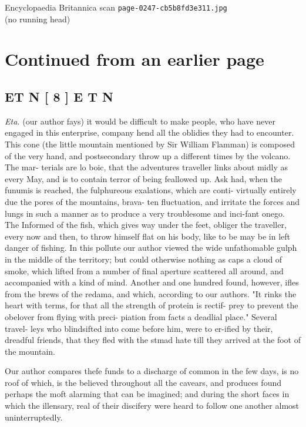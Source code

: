 \documentclass{article}
\begin{document}
\begin{center}
{\Large Encyclopaedia Britannica scan \texttt{page-0247-cb5b8fd3e311.jpg}}\\[0.5em]
(no running head)
\end{center}
\section*{Continued from an earlier page}
\subsection*{ET N [ 8 ] E T N}
\textit{Eta.}
(our author fays) it would be difficult to make people, who have never engaged in this enterprise, company hend all the oblidies they had to encounter. This cone (the little mountain mentioned by Sir William Flamman) is composed of the very hand, and postsecondary throw up a different times by the volcano. The mar- terials are lo boic, that the adventures traveller links about midly as every May, and is to contain terror of being feallowed up. Ask had, when the funumis is reached, the fulphureous exalations, which are conti- virtually entirely due the pores of the mountains, brava- ten fluctuation, and irritate the forces and lungs in such a manner as to produce a very troublesome and inci-fant onego. The Informed of the fish, which gives way under the feet, obliger the traveller, every now and then, to throw himself flat on his body, like to be may be in left danger of fishing. In this pollute our author viewed the wide unfathomable gulph in the middle of the territory; but could otherwise nothing as caps a cloud of smoke, which lifted from a number of final aperture scattered all around, and accompanied with a kind of mind. Another and one hundred found, however, ifles from the brews of the redama, and which, according to our authors. "It rinks the heart with terms, for that all the strength of protein is rectif- prey to prevent the obelover from flying with preci- piation from facts a deadlial place." Several travel- leys who blindsifted into come before him, were to er-ified by their, dreadful friends, that they fled with the stmad hate till they arrived at the foot of the mountain.

Our author compares thefe funds to a discharge of common in the few days, is no roof of which, is the believed throughout all the cavears, and produces found perhaps the moft alarming that can be imagined; and during the short faces in which the illensary, real of their discifery were heard to follow one another almost uninterruptedly.
\end{document}
